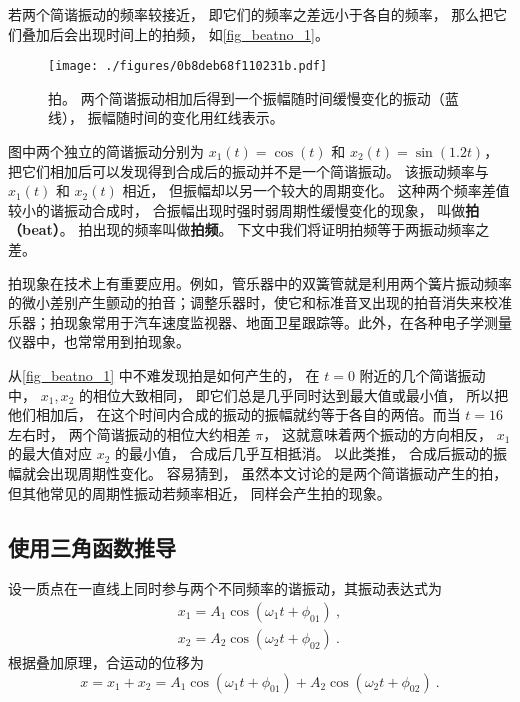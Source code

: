 

若两个简谐振动的频率较接近， 即它们的频率之差远小于各自的频率， 那么把它们叠加后会出现时间上的拍频， 如\autoref{fig_beatno_1}。
\begin{figure}[ht]
\centering
\texttt{[image: ./figures/0b8deb68f110231b.pdf]}
\caption{拍。 两个简谐振动相加后得到一个振幅随时间缓慢变化的振动（蓝线）， 振幅随时间的变化用红线表示。} \label{fig_beatno_1}
\end{figure}
图中两个独立的简谐振动分别为 $x_1(t) = \cos(t)$ 和 $x_2(t) = \sin(1.2t)$， 把它们相加后可以发现得到合成后的振动并不是一个简谐振动。 该振动频率与 $x_1(t)$ 和 $x_2(t)$ 相近， 但振幅却以另一个较大的周期变化。 这种两个频率差值较小的谐振动合成时， 合振幅出现时强时弱周期性缓慢变化的现象， 叫做\textbf{拍（beat）}。 拍出现的频率叫做\textbf{拍频}。 下文中我们将证明拍频等于两振动频率之差。

拍现象在技术上有重要应用。例如，管乐器中的双簧管就是利用两个簧片振动频率的微小差别产生颤动的拍音；调整乐器时，使它和标准音叉出现的拍音消失来校准乐器；拍现象常用于汽车速度监视器、地面卫星跟踪等。此外，在各种电子学测量仪器中，也常常用到拍现象。

从\autoref{fig_beatno_1} 中不难发现拍是如何产生的， 在 $t = 0$ 附近的几个简谐振动中， $x_1, x_2$ 的相位大致相同， 即它们总是几乎同时达到最大值或最小值， 所以把他们相加后， 在这个时间内合成的振动的振幅就约等于各自的两倍。而当 $t = 16$ 左右时， 两个简谐振动的相位大约相差 $\pi$， 这就意味着两个振动的方向相反， $x_1$ 的最大值对应 $x_2$ 的最小值， 合成后几乎互相抵消。 以此类推， 合成后振动的振幅就会出现周期性变化。
容易猜到， 虽然本文讨论的是两个简谐振动产生的拍， 但其他常见的周期性振动若频率相近， 同样会产生拍的现象。

\subsection{使用三角函数推导}
设一质点在一直线上同时参与两个不同频率的谐振动，其振动表达式为
\begin{equation}
\begin{array}{l}x_{1}=A_{1} \cos \left(\omega_{1} t+\phi_{01}\right) ~,\\ x_{2}=A_{2} \cos \left(\omega_{2} t+\phi_{02}\right)~.\end{array}
\end{equation}
根据叠加原理，合运动的位移为
\begin{equation}
x=x_{1}+x_{2}=A_{1} \cos \left(\omega_{1} t+\phi_{01}\right)+A_{2} \cos \left(\omega_{2} t+\phi_{02}\right)~.
\end{equation}


